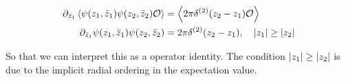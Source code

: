 \begin{align*}
    \partial_{{\bar z}_1}\expval{\psi\qty(z_1,{\bar z}_1)\psi\qty(z_2,{\bar z}_2)\mathcal O}&=\expval{2\pi\delta^{\qty(2)}\qty(z_2-z_1)\mathcal O}\\
    \partial_{{\bar z}_1}\psi\qty(z_1,{\bar z}_1)\psi\qty(z_2,{\bar z}_2)&=2\pi\delta^{\qty(2)}\qty(z_2-z_1),\ \ \ \abs{z_1}\geq\abs{z_2}
\end{align*}

So that we can interpret this as a operator identity. The condition $\abs{z_1}\geq \abs{z_2}$ is due to the implicit radial ordering in the expectation 
value.

\probitem{}
\probitem{}
\probitem{}
\probitem{}
\probitem{}